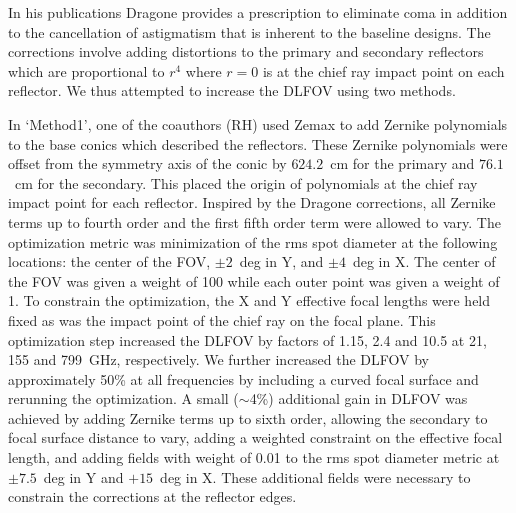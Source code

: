 \documentclass[]{spie}  %
\newcommand{\comr}[1]{\textcolor{red}{#1}}
\newcommand{\comb}[1]{\textcolor{blue}{#1}}
\newcommand{\como}[1]{\textcolor{orange}{#1}}
\begin{document}
In his publications Dragone provides a prescription to eliminate coma
in addition to the cancellation of astigmatism that is inherent to the baseline designs.\cite{dragone_coma} The corrections 
involve adding distortions to the primary and secondary reflectors 
which are proportional to $r^4$ where $r=0$ is at the chief ray impact point on each reflector. 
We thus attempted to increase the DLFOV using two methods. 

In `Method1', one of the coauthors (RH) used Zemax to add Zernike 
polynomials to the base conics which described the reflectors. These Zernike polynomials were offset from the symmetry axis of the conic 
by $624.2$~cm for the primary and $76.1$~cm for the secondary.  
This placed the origin of polynomials at the chief ray impact point for each reflector. 
Inspired by the Dragone corrections, all Zernike terms up to fourth order and the first fifth order term were allowed to vary. 
The optimization metric was minimization of the rms spot diameter at 
the following locations: the center of the FOV, $\pm2$~deg in Y, and $\pm4$~deg in X. The center of the FOV was given a weight of 100
while each outer point was given a weight of 1. To constrain the optimization, the X and Y 
effective focal lengths were held fixed as was the impact point of the chief ray on the focal plane. 
This optimization step increased the DLFOV
by factors of 1.15, 2.4 and 10.5 at 21, 155 and 799~GHz, respectively. 
We further increased the DLFOV by approximately 50\% at all frequencies by including a curved focal surface and rerunning the optimization.
A small ($\sim$4\%) additional gain in DLFOV was achieved by adding Zernike terms 
up to sixth order, allowing the secondary to focal surface distance to vary, adding a weighted constraint on the effective focal length, 
and adding fields with weight of 0.01 to the rms spot diameter metric at $\pm7.5$~deg in Y and $+15$~deg in X. 
These additional fields were necessary to constrain the corrections at the reflector edges.

\end{document}
